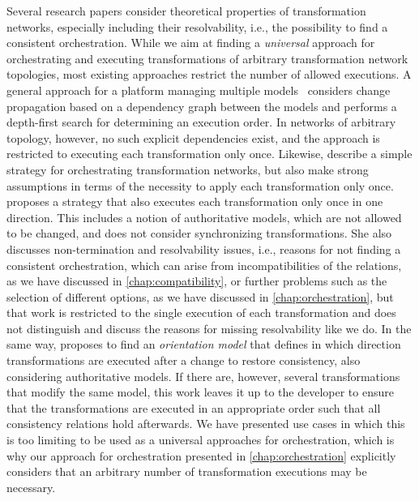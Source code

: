 Several research papers consider theoretical properties of transformation networks, especially including their resolvability, i.e., the possibility to find a consistent orchestration.
While we aim at finding a \emph{universal} approach for orchestrating and executing transformations of arbitrary transformation network topologies, most existing approaches restrict the number of allowed executions.
A general approach for a platform managing multiple models~\cite{denton2008naomi-Models} considers change propagation based on a dependency graph between the models and performs a depth-first search for determining an execution order.
In networks of arbitrary topology, however, no such explicit dependencies exist, and the approach is restricted to executing each transformation only once.
Likewise, \textcite{dirocco2017ConsistencyRecoveryInteractive-MODELS} describe a simple strategy for orchestrating transformation networks, but also make strong assumptions in terms of the necessity to apply each transformation only once.
\textcite{stevens2020BidirectionalTransformationLarge-SoSym} proposes a strategy that also executes each transformation only once in one direction. This includes a notion of authoritative models, which are not allowed to be changed, and does not consider synchronizing transformations.
She also discusses non-termination and resolvability issues, i.e., reasons for not finding a consistent orchestration, which can arise from incompatibilities of the relations, as we have discussed in \autoref{chap:compatibility}, or further problems such as the selection of different options, as we have discussed in \autoref{chap:orchestration}, but that work is restricted to the single execution of each transformation and does not distinguish and discuss the reasons for missing resolvability like we do.
In the same way, \cite{stevens2020BuildingFromMegamodels-SoSym} proposes to find an \emph{orientation model} that defines in which direction transformations are executed after a change to restore consistency, also considering authoritative models.
If there are, however, several transformations that modify the same model, this work leaves it up to the developer to ensure that the transformations are executed in an appropriate order such that all consistency relations hold afterwards.
We have presented use cases in which this is too limiting to be used as a universal approaches for orchestration, which is why our approach for orchestration presented in \autoref{chap:orchestration} explicitly considers that an arbitrary number of transformation executions may be necessary.

